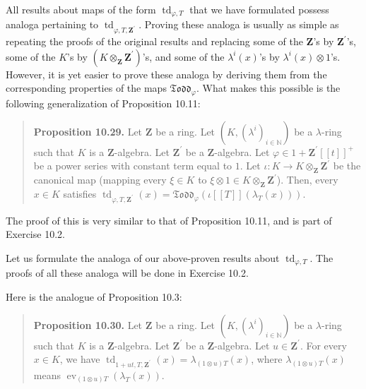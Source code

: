 \documentclass[numbers=enddot,12pt,final,onecolumn,notitlepage]{scrartcl}%
\begin{document}
All results about maps of the form $\operatorname*{td}\nolimits_{\varphi,T}$
that we have formulated possess analoga pertaining to $\operatorname*{td}%
\nolimits_{\varphi,T,\mathbf{Z}^{\prime}}$. Proving these analoga is usually
as simple as repeating the proofs of the original results and replacing some
of the $\mathbf{Z}$'s by $\mathbf{Z}^{\prime}$'s, some of the $K$'s by
$\left(  K\otimes_{\mathbf{Z}}\mathbf{Z}^{\prime}\right)  $'s, and some of the
$\lambda^{i}\left(  x\right)  $'s by $\lambda^{i}\left(  x\right)  \otimes
1$'s. However, it is yet easier to prove these analoga by deriving them from
the corresponding properties of the maps $\mathfrak{Todd}_{\varphi}$. What
makes this possible is the following generalization of Proposition 10.11:

\begin{quote}
\textbf{Proposition 10.29.} Let $\mathbf{Z}$ be a ring. Let $\left(  K,\left(
\lambda^{i}\right)  _{i\in\mathbb{N}}\right)  $ be a $\lambda$-ring such that
$K$ is a $\mathbf{Z}$-algebra. Let $\mathbf{Z}^{\prime}$ be a $\mathbf{Z}%
$-algebra. Let $\varphi\in1+\mathbf{Z}^{\prime}\left[  \left[  t\right]
\right]  ^{+}$ be a power series with constant term equal to $1$. Let
$\iota:K\rightarrow K\otimes_{\mathbf{Z}}\mathbf{Z}^{\prime}$ be the canonical
map (mapping every $\xi\in K$ to $\xi\otimes1\in K\otimes_{\mathbf{Z}%
}\mathbf{Z}^{\prime}$). Then, every $x\in K$ satisfies $\operatorname*{td}%
_{\varphi,T,\mathbf{Z}^{\prime}}\left(  x\right)  =\mathfrak{Todd}_{\varphi
}\left(  \iota\left[  \left[  T\right]  \right]  \left(  \lambda_{T}\left(
x\right)  \right)  \right)  $.
\end{quote}

The proof of this is very similar to that of Proposition 10.11, and is part of
Exercise 10.2.

Let us formulate the analoga of our above-proven results about
$\operatorname*{td}\nolimits_{\varphi,T}$. The proofs of all these analoga
will be done in Exercise 10.2.

Here is the analogue of Proposition 10.3:

\begin{quote}
\textbf{Proposition 10.30.} Let $\mathbf{Z}$ be a ring. Let $\left(  K,\left(
\lambda^{i}\right)  _{i\in\mathbb{N}}\right)  $ be a $\lambda$-ring such that
$K$ is a $\mathbf{Z}$-algebra. Let $\mathbf{Z}^{\prime}$ be a $\mathbf{Z}%
$-algebra. Let $u\in\mathbf{Z}^{\prime}$. For every $x\in K$, we have
$\operatorname*{td}\nolimits_{1+ut,T,\mathbf{Z}^{\prime}}\left(  x\right)
=\lambda_{\left(  1\otimes u\right)  T}\left(  x\right)  $, where
$\lambda_{\left(  1\otimes u\right)  T}\left(  x\right)  $ means
$\operatorname*{ev}\nolimits_{\left(  1\otimes u\right)  T}\left(  \lambda
_{T}\left(  x\right)  \right)  $.
\end{quote}
\end{document}
